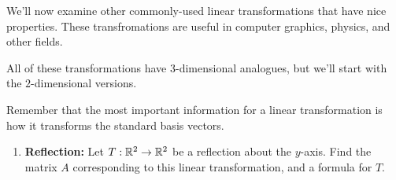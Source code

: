 \documentclass{ximera}
\begin{document}
    \begin{example}

        We'll now examine other commonly-used linear transformations that have nice properties. These transfromations are useful in computer graphics, physics, and other fields. 

        All of these transformations have $3$-dimensional analogues, but we'll start with the $2$-dimensional versions.

        Remember that the most important information for a linear transformation is how it transforms the standard basis vectors.

        \begin{enumerate}

            \item {\bf Reflection:} Let $T:\mathbb{R}^2\to\mathbb{R}^2$ be a reflection about the $y$-axis. Find the
            matrix%
             $A$ corresponding to this
            linear transformation, and a formula for $T$.
          

\end{enumerate}
\end{example}
\end{document}
